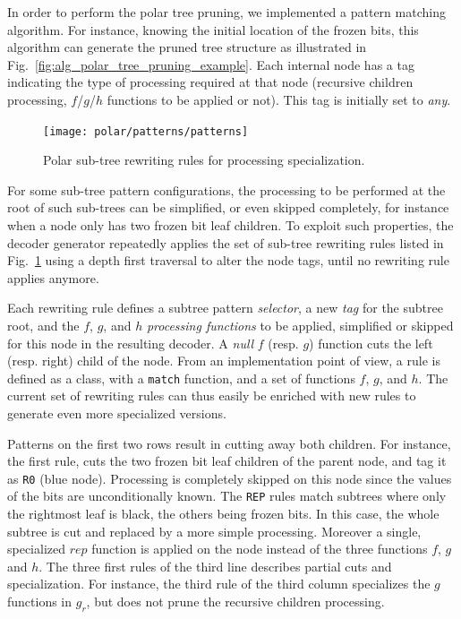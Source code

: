 In order to perform the polar tree pruning, we implemented a pattern matching
algorithm. For instance, knowing the initial location of the frozen bits, this
algorithm can generate the pruned tree structure as illustrated in
Fig.~\ref{fig:alg_polar_tree_pruning_example}. Each internal node has a tag
indicating the type of processing required at that node (recursive children
processing, $f$/$g$/$h$ functions to be applied or not). This tag is initially
set to \emph{any}.

\begin{figure}[htp]
  \centering
  \texttt{[image: polar/patterns/patterns]}
  \caption{Polar sub-tree rewriting rules for processing specialization.}
  \label{fig:opt_polar_patterns}
\end{figure}

For some sub-tree pattern configurations, the processing to be performed at the
root of such sub-trees can be simplified, or even skipped completely, for
instance when a node only has two frozen bit leaf children. To exploit such
properties, the decoder generator repeatedly applies the set of sub-tree
rewriting rules listed in Fig.~\ref{fig:opt_polar_patterns} using a depth first
traversal to alter the node tags, until no rewriting rule applies anymore.

Each rewriting rule defines a subtree pattern \emph{selector}, a new \emph{tag}
for the subtree root, and the $f$, $g$, and $h$ \emph{processing functions} to
be applied, simplified or skipped for this node in the resulting decoder. A
\emph{null} $f$ (resp. $g$) function cuts the left (resp. right) child of the
node. From an implementation point of view, a rule is defined as a class, with a
\verb|match| function, and a set of functions $f$, $g$, and $h$. The current
set of rewriting rules can thus easily be enriched with new rules to generate
even more specialized versions.

Patterns on the first two rows result in cutting away both children. For
instance, the first rule, cuts the two frozen bit leaf children of the parent
node, and tag it as \verb|R0| (blue node). Processing is completely skipped on
this node since the values of the bits are unconditionally known. The \verb|REP|
rules match subtrees where only the rightmost leaf is black, the others being
frozen bits. In this case, the whole subtree is cut and replaced by a more
simple processing. Moreover a single, specialized $rep$ function is applied
on the node instead of the three functions $f$, $g$ and $h$. The three first
rules of the third line describes partial cuts and specialization. For instance,
the third rule of the third column specializes the $g$ functions in $g_r$, but
does not prune the recursive children processing.

